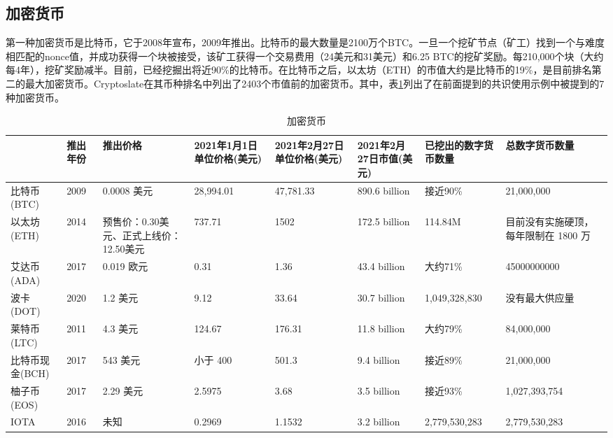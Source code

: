 \begin{translation}
\subsection{加密货币}

第一种加密货币是比特币，它于2008年宣布，2009年推出。比特币的最大数量是2100万个BTC。一旦一个挖矿节点（矿工）找到一个与难度相匹配的nonce值，并成功获得一个块被接受，该矿工获得一个交易费用（24美元和31美元）和6.25 BTC的挖矿奖励。每210,000个块（大约每4年），挖矿奖励减半。目前，已经挖掘出将近90\%的比特币。在比特币之后，以太坊（ETH）的市值大约是比特币的19\%，是目前排名第二的最大加密货币。Cryptoslate在其币种排名中列出了2403个市值前的加密货币\cite{art47}。其中，表\ref{tab:加密货币}列出了在前面提到的共识使用示例中被提到的7种加密货币。
\begin{center} 
\begin{longtable}[h] 
{|p{1.4cm}|p{0.8cm}|p{1.4cm}|p{1.4cm}|p{1.4cm}|p{1.4cm}|p{2cm}|p{2cm}|} 
    \caption{加密货币\cite{art48}}
    \label{tab:加密货币}\\
    \hline &推出年份&推出价格&2021年1月1日单位价格(美元)&2021年2月27日单位价格(美元)&2021年2月27日市值(美元)&已挖出的数字货币数量&总数字货币数量 \\
    \hline 比特币(BTC)&2009&0.0008 美元&28,994.01&47,781.33&890.6 billion&接近90\%&21,000,000\\
    \hline
    以太坊(ETH)&2014&预售价：0.30美元、正式上线价：12.50美元&737.71&1502&172.5 billion&114.84M&目前没有实施硬顶，每年限制在 1800 万\\
    \hline
    艾达币(ADA)&2017&0.019 欧元&0.31&1.36&43.4 billion&大约71\%&45000000000\\
    \hline
    波卡(DOT)&2020&1.2 美元&9.12&33.64&30.7 billion&1,049,328,830&没有最大供应量\\
    \hline
    莱特币(LTC)&2011&4.3 美元&124.67&176.31&11.8 billion&大约79\%&84,000,000\\
    \hline
    比特币现金(BCH)&2017&543 美元&小于 400&501.3&9.4 billion&接近89\%&21,000,000\\
    \hline
    柚子币(EOS)&2017&2.29 美元&2.5975&3.68&3.5 billion&接近93\%&1,027,393,754\\
    \hline
    IOTA&2016&未知&0.2969&1.1532&3.2 billion&2,779,530,283&2,779,530,283 \\
    \hline 
\end{longtable}
\end{center}


\end{translation}
